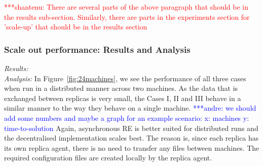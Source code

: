 \documentclass{rspublic}
\newcommand{\jhanote}[1]{ {\textcolor{red} { ***shantenu: #1 }}}
\newcommand{\alnote}[1]{ {\textcolor{blue} { ***andre: #1 }}}
\newcommand{\alnote}[1]{}
\newcommand{\jhanote}[1]{}
\begin{document}
\jhanote{There are several parts of the above paragraph that should be
  in the results sub-section. Similarly, there are parts in the
  experiments section for 'scale-up' that should be in the results
  section}

\subsubsection{Scale out performance: Results and Analysis}

{\it Results:}\\


{\it Analysis: } In Figure~\ref{fig:24machines}, we see the performance
of all three cases when run in a distributed manner across two
machines. As the data that is exchanged between replicas is very
small, the Cases I, II and III behave in a similar manner to the way
they behave on a single machine. \alnote{we should add some numbers
  and maybe a graph for an example scenario: x: machines y:
  time-to-solution} Again, asynchronous RE is better suited for
distributed runs and the decentralised implementation scales best. The
reason is, since each replica has its own replica agent, there is no
need to transfer any files between machines. The required
configuration files are created locally by the replica agent.
\end{document}
